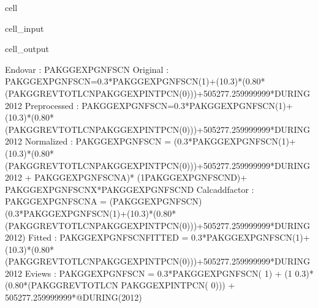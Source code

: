 \documentclass[letterpaper,10pt,english]{jupyterBook}
\begin{document}
\begin{sphinxuseclass}{cell}\begin{sphinxVerbatimInput}

\begin{sphinxuseclass}{cell_input}
\begin{sphinxVerbatim}[commandchars=\\\{\}]
\PYG{p}{[}\PYG{p}{]}\PYG{p}{[}\PYG{p}{]}
\end{sphinxVerbatim}

\end{sphinxuseclass}\end{sphinxVerbatimInput}
\begin{sphinxVerbatimOutput}

\begin{sphinxuseclass}{cell_output}
\begin{sphinxVerbatim}[commandchars=\\\{\}]
Endo\PYGZus{}var        : PAKGGEXPGNFSCN
Original        : PAKGGEXPGNFSCN=0.3*PAKGGEXPGNFSCN(\PYGZhy{}1)+(1\PYGZhy{}0.3)*(0.80*(PAKGGREVTOTLCN\PYGZhy{}PAKGGEXPINTPCN(\PYGZhy{}0)))+505277.259999999*DURING\PYGZus{}2012
Preprocessed    : PAKGGEXPGNFSCN=0.3*PAKGGEXPGNFSCN(\PYGZhy{}1)+(1\PYGZhy{}0.3)*(0.80*(PAKGGREVTOTLCN\PYGZhy{}PAKGGEXPINTPCN(\PYGZhy{}0)))+505277.259999999*DURING\PYGZus{}2012
Normalized      : PAKGGEXPGNFSCN = (0.3*PAKGGEXPGNFSCN(\PYGZhy{}1)+(1\PYGZhy{}0.3)*(0.80*(PAKGGREVTOTLCN\PYGZhy{}PAKGGEXPINTPCN(\PYGZhy{}0)))+505277.259999999*DURING\PYGZus{}2012 + PAKGGEXPGNFSCN\PYGZus{}A)* (1\PYGZhy{}PAKGGEXPGNFSCN\PYGZus{}D)+ PAKGGEXPGNFSCN\PYGZus{}X*PAKGGEXPGNFSCN\PYGZus{}D 
Calc\PYGZus{}add\PYGZus{}factor : PAKGGEXPGNFSCN\PYGZus{}A = (PAKGGEXPGNFSCN) \PYGZhy{} (0.3*PAKGGEXPGNFSCN(\PYGZhy{}1)+(1\PYGZhy{}0.3)*(0.80*(PAKGGREVTOTLCN\PYGZhy{}PAKGGEXPINTPCN(\PYGZhy{}0)))+505277.259999999*DURING\PYGZus{}2012)
Fitted          : PAKGGEXPGNFSCN\PYGZus{}FITTED = 0.3*PAKGGEXPGNFSCN(\PYGZhy{}1)+(1\PYGZhy{}0.3)*(0.80*(PAKGGREVTOTLCN\PYGZhy{}PAKGGEXPINTPCN(\PYGZhy{}0)))+505277.259999999*DURING\PYGZus{}2012
Eviews          : PAKGGEXPGNFSCN = 0.3*PAKGGEXPGNFSCN( \PYGZhy{} 1) + (1 \PYGZhy{} 0.3)*(0.80*(PAKGGREVTOTLCN \PYGZhy{} PAKGGEXPINTPCN( \PYGZhy{} 0))) + 505277.259999999*@DURING(\PYGZdq{}2012\PYGZdq{})
\end{sphinxVerbatim}

\begin{sphinxVerbatim}[commandchars=\\\{\}]

\end{sphinxVerbatim}

\end{sphinxuseclass}\end{sphinxVerbatimOutput}

\end{sphinxuseclass}
\end{document}

